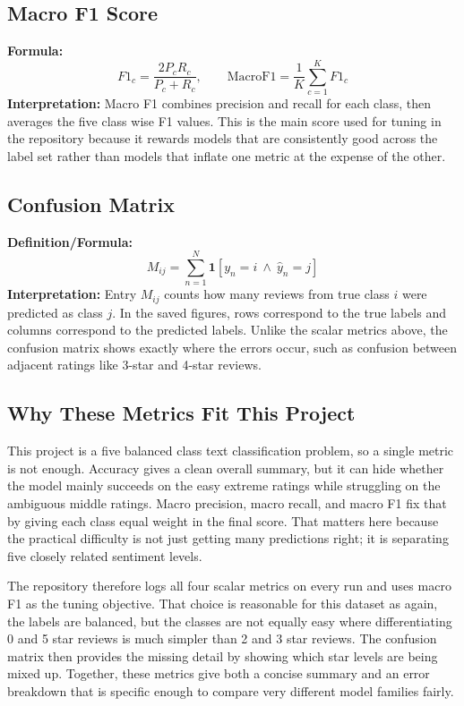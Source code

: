 \documentclass[12pt]{article}
\begin{document}
\subsection{Macro F1 Score}
\textbf{Formula:}
\[
    F1_c = \frac{2P_cR_c}{P_c + R_c},
    \qquad
    \mathrm{MacroF1} = \frac{1}{K}\sum_{c=1}^{K} F1_c
\]
\textbf{Interpretation:}
Macro F1 combines precision and recall for each class, then averages the five class wise F1 values. This is the main score used for tuning in the repository because it rewards models that are consistently good across the label set rather than models that inflate one metric at the expense of the other.

\subsection{Confusion Matrix}
\textbf{Definition/Formula:}
\[
    M_{ij} = \sum_{n=1}^{N} \mathbf{1}[y_n = i \ \land\ \hat{y}_n = j]
\]
\textbf{Interpretation:}
Entry $M_{ij}$ counts how many reviews from true class $i$ were predicted as class $j$. In the saved figures, rows correspond to the true labels and columns correspond to the predicted labels. Unlike the scalar metrics above, the confusion matrix shows exactly where the errors occur, such as confusion between adjacent ratings like 3-star and 4-star reviews.

\subsection{Why These Metrics Fit This Project}

This project is a five balanced class text classification problem, so a single metric is not enough. Accuracy gives a clean overall summary, but it can hide whether the model mainly succeeds on the easy extreme ratings while struggling on the ambiguous middle ratings. Macro precision, macro recall, and macro F1 fix that by giving each class equal weight in the final score. That matters here because the practical difficulty is not just getting many predictions right; it is separating five closely related sentiment levels.

The repository therefore logs all four scalar metrics on every run and uses macro F1 as the tuning objective. That choice is reasonable for this dataset as again, the labels are balanced, but the classes are not equally easy where differentiating 0 and 5 star reviews is much simpler than 2 and 3 star reviews. The confusion matrix then provides the missing detail by showing which star levels are being mixed up. Together, these metrics give both a concise summary and an error breakdown that is specific enough to compare very different model families fairly.
\end{document}
